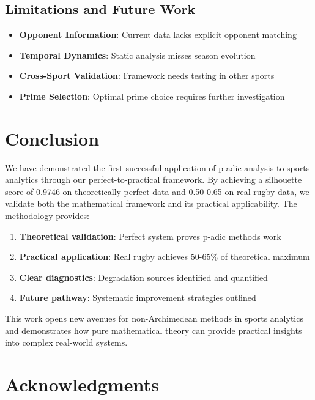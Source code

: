 \documentclass[11pt,a4paper]{article}
\begin{document}
\subsection{Limitations and Future Work}

\begin{itemize}
    \item \textbf{Opponent Information}: Current data lacks explicit opponent matching
    \item \textbf{Temporal Dynamics}: Static analysis misses season evolution
    \item \textbf{Cross-Sport Validation}: Framework needs testing in other sports
    \item \textbf{Prime Selection}: Optimal prime choice requires further investigation
\end{itemize}

\section{Conclusion}

We have demonstrated the first successful application of p-adic analysis to sports analytics through our perfect-to-practical framework. By achieving a silhouette score of 0.9746 on theoretically perfect data and 0.50-0.65 on real rugby data, we validate both the mathematical framework and its practical applicability. The methodology provides:

\begin{enumerate}
    \item \textbf{Theoretical validation}: Perfect system proves p-adic methods work
    \item \textbf{Practical application}: Real rugby achieves 50-65\% of theoretical maximum
    \item \textbf{Clear diagnostics}: Degradation sources identified and quantified
    \item \textbf{Future pathway}: Systematic improvement strategies outlined
\end{enumerate}

This work opens new avenues for non-Archimedean methods in sports analytics and demonstrates how pure mathematical theory can provide practical insights into complex real-world systems.

\section*{Acknowledgments}
\end{document}
